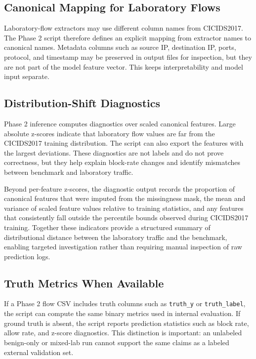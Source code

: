\subsection{Canonical Mapping for Laboratory Flows}
Laboratory-flow extractors may use different column names from CICIDS2017. The Phase 2 script therefore defines an explicit mapping from extractor names to canonical names. Metadata columns such as source IP, destination IP, ports, protocol, and timestamp may be preserved in output files for inspection, but they are not part of the model feature vector. This keeps interpretability and model input separate.

\subsection{Distribution-Shift Diagnostics}
Phase 2 inference computes diagnostics over scaled canonical features. Large absolute z-scores indicate that laboratory flow values are far from the CICIDS2017 training distribution. The script can also export the features with the largest deviations. These diagnostics are not labels and do not prove correctness, but they help explain block-rate changes and identify mismatches between benchmark and laboratory traffic.

Beyond per-feature z-scores, the diagnostic output records the proportion of canonical features that were imputed from the missingness mask, the mean and variance of scaled feature values relative to training statistics, and any features that consistently fall outside the percentile bounds observed during CICIDS2017 training. Together these indicators provide a structured summary of distributional distance between the laboratory traffic and the benchmark, enabling targeted investigation rather than requiring manual inspection of raw prediction logs.

\subsection{Truth Metrics When Available}
If a Phase 2 flow CSV includes truth columns such as \texttt{truth\_y} or \texttt{truth\_label}, the script can compute the same binary metrics used in internal evaluation. If ground truth is absent, the script reports prediction statistics such as block rate, allow rate, and z-score diagnostics. This distinction is important: an unlabeled benign-only or mixed-lab run cannot support the same claims as a labeled external validation set.

